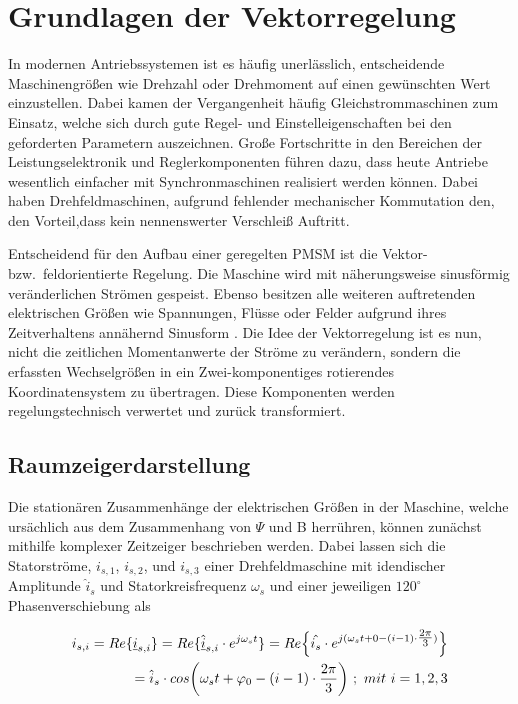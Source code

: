
\chapter{Grundlagen der Vektorregelung}
\label{cha:Grundlagen der Vektorregelung}

In modernen Antriebssystemen ist es häufig unerlässlich, entscheidende Maschinengrößen wie Drehzahl oder Drehmoment auf einen gewünschten Wert einzustellen.
Dabei kamen der Vergangenheit häufig Gleichstrommaschinen zum Einsatz, welche sich durch gute Regel- und Einstelleigenschaften bei den geforderten Parametern auszeichnen.
Große Fortschritte in den Bereichen der Leistungselektronik und Reglerkomponenten führen dazu, dass heute Antriebe wesentlich einfacher mit Synchronmaschinen realisiert werden können.
Dabei haben Drehfeldmaschinen, aufgrund fehlender mechanischer Kommutation den, den Vorteil,dass kein nennenswerter Verschleiß Auftritt.

Entscheidend für den Aufbau einer geregelten PMSM ist die Vektor- bzw.\ feldorientierte Regelung. 
Die Maschine wird mit näherungsweise sinusförmig veränderlichen Strömen gespeist. 
Ebenso besitzen alle weiteren auftretenden elektrischen Größen wie Spannungen, Flüsse oder Felder aufgrund ihres Zeitverhaltens annähernd Sinusform \parencite[S.~1]{nuss2010}.	
Die Idee der Vektorregelung ist es nun, nicht die zeitlichen Momentanwerte der Ströme zu verändern, sondern die erfassten Wechselgrößen in ein Zwei-komponentiges rotierendes Koordinatensystem zu übertragen.
Diese Komponenten werden regelungstechnisch verwertet und zurück transformiert.

\section{Raumzeigerdarstellung}
\label{sec:raumzeiger}

Die stationären Zusammenhänge der elektrischen Größen in der Maschine, welche ursächlich aus dem Zusammenhang von $\Psi$ und B herrühren, können zunächst mithilfe komplexer Zeitzeiger beschrieben werden. Dabei lassen sich die Statorströme, $i_{s,1}$, $i_{s,2}$, und $i_{s,3}$ einer Drehfeldmaschine mit idendischer Amplitunde $\hat i_{s}$ und Statorkreisfrequenz $\omega_{s}$  und einer jeweiligen $120^\circ$ Phasenverschiebung als

\begin{align}
	\begin{split}
	i_{s,i} = Re\{\underline{i}_{s,i}\} = Re\{\underline{\hat i}_{s,i}\cdot e^{j\omega_{s}t}\} = Re\Bigl\{\hat{i_{s}}\cdot e^{j(\omega_{s}t+0-(i-1)\cdot\tfrac{2\pi}{3})}\Bigr\}
	\\= \hat{i}_{s}\cdot cos\bigg(\omega_{s}t+\varphi_{0}-(i-1)\cdot\frac{2\pi}{3}\bigg)~;~mit~i=1,2,3 \label{statorströme} 
\end{split}
\end{align}

